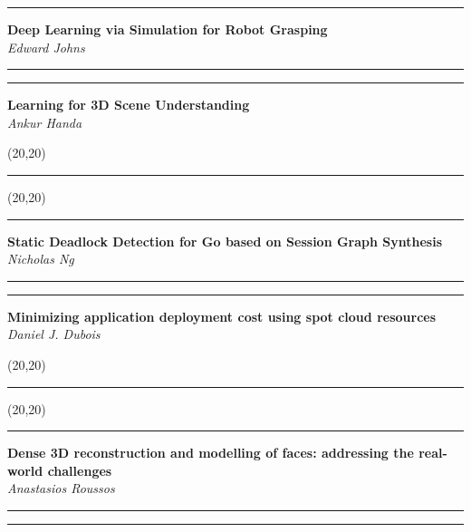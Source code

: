 \documentclass[11pt]{article}
\newcommand{\talk}[1]{\Large\flushleft\textbf{#1}\\}
\newcommand{\speaker}[1]{\textit{#1}\\}
\newcommand{\separator}{\noindent\rule{\linewidth}{0.1mm}}
\newcommand{\votebox}{\vspace{-5cm}\noindent\hfill\framebox(20,20){}}
\newcommand{\hstrut}{\noindent\color{iclightblue}\rule{\linewidth}{0pt}}
\begin{document}
\begin{minipage}[t]{0.49\linewidth}
\separator%
\talk{Deep Learning via Simulation for Robot Grasping}
\speaker{Edward Johns}
\end{minipage}
\begin{minipage}[t]{0.02\linewidth}
\hstrut%
\end{minipage}
\begin{minipage}[t]{0.49\linewidth}
\separator%
\talk{Learning for 3D Scene Understanding}
\speaker{Ankur Handa}
\end{minipage}
\vfill
\noindent
\begin{minipage}[b]{0.49\linewidth}
\votebox%
\end{minipage}
\begin{minipage}[b]{0.02\linewidth}
\hstrut%
\end{minipage}
\begin{minipage}[b]{0.49\linewidth}
\votebox%
\end{minipage}
\noindent
\begin{minipage}[t]{0.49\linewidth}
\separator%
\talk{Static Deadlock Detection for Go based on Session Graph Synthesis}
\speaker{Nicholas Ng}
\end{minipage}
\begin{minipage}[t]{0.02\linewidth}
\hstrut%
\end{minipage}
\begin{minipage}[t]{0.49\linewidth}
\separator%
\talk{Minimizing application deployment cost using spot cloud resources}
\speaker{Daniel J. Dubois}
\end{minipage}
\vfill
\noindent
\begin{minipage}[b]{0.49\linewidth}
\votebox%
\end{minipage}
\begin{minipage}[b]{0.02\linewidth}
\hstrut%
\end{minipage}
\begin{minipage}[b]{0.49\linewidth}
\votebox%
\end{minipage}
\noindent
\begin{minipage}[t]{0.49\linewidth}
\separator%
\talk{Dense 3D reconstruction and modelling of faces: addressing the real-world
      challenges}
\speaker{Anastasios Roussos}
\end{minipage}
\begin{minipage}[t]{0.02\linewidth}
\hstrut%
\end{minipage}
\begin{minipage}[t]{0.49\linewidth}
\separator%
\end{minipage}
\end{document}
